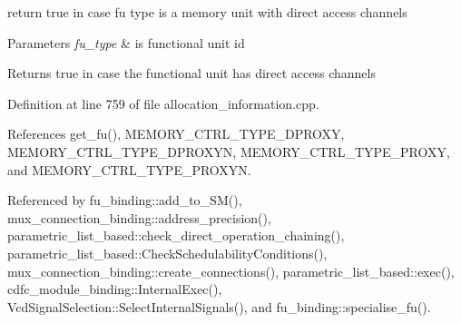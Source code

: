 return true in case fu type is a memory unit with direct access channels 


\begin{DoxyParams}{Parameters}
{\em fu\+\_\+type} & is functional unit id \\
\hline
\end{DoxyParams}
\begin{DoxyReturn}{Returns}
true in case the functional unit has direct access channels 
\end{DoxyReturn}


Definition at line 759 of file allocation\+\_\+information.\+cpp.



References get\+\_\+fu(), M\+E\+M\+O\+R\+Y\+\_\+\+C\+T\+R\+L\+\_\+\+T\+Y\+P\+E\+\_\+\+D\+P\+R\+O\+XY, M\+E\+M\+O\+R\+Y\+\_\+\+C\+T\+R\+L\+\_\+\+T\+Y\+P\+E\+\_\+\+D\+P\+R\+O\+X\+YN, M\+E\+M\+O\+R\+Y\+\_\+\+C\+T\+R\+L\+\_\+\+T\+Y\+P\+E\+\_\+\+P\+R\+O\+XY, and M\+E\+M\+O\+R\+Y\+\_\+\+C\+T\+R\+L\+\_\+\+T\+Y\+P\+E\+\_\+\+P\+R\+O\+X\+YN.



Referenced by fu\+\_\+binding\+::add\+\_\+to\+\_\+\+S\+M(), mux\+\_\+connection\+\_\+binding\+::address\+\_\+precision(), parametric\+\_\+list\+\_\+based\+::check\+\_\+direct\+\_\+operation\+\_\+chaining(), parametric\+\_\+list\+\_\+based\+::\+Check\+Schedulability\+Conditions(), mux\+\_\+connection\+\_\+binding\+::create\+\_\+connections(), parametric\+\_\+list\+\_\+based\+::exec(), cdfc\+\_\+module\+\_\+binding\+::\+Internal\+Exec(), Vcd\+Signal\+Selection\+::\+Select\+Internal\+Signals(), and fu\+\_\+binding\+::specialise\+\_\+fu().

